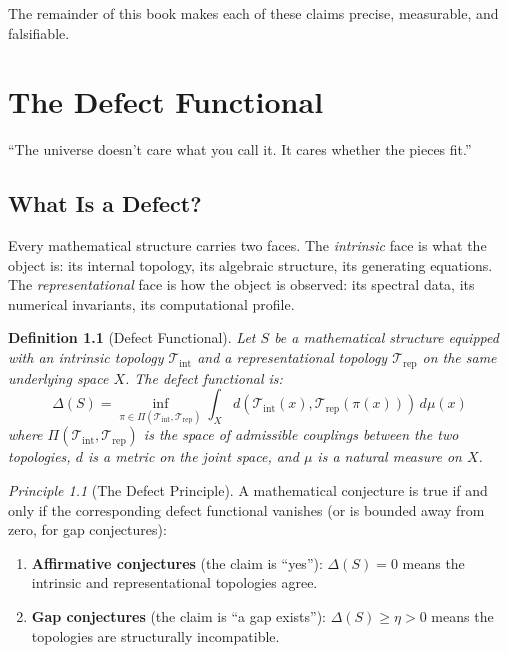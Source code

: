 \documentclass[12pt, openany]{book}
\newtheorem{definition}[theorem]{Definition}
\theoremstyle{remark}
\newtheorem{principle}[theorem]{Principle}
\newcommand{\Tint}{\mathcal{T}_{\mathrm{int}}}
\newcommand{\Trep}{\mathcal{T}_{\mathrm{rep}}}
\begin{document}
\noindent
The remainder of this book makes each of these claims precise, measurable, and
falsifiable.

\bigskip


\chapter{The Defect Functional}
\label{ch:defect}

\epigraph{``The universe doesn't care what you call it. It cares whether the pieces fit.''}{}

\section{What Is a Defect?}

Every mathematical structure carries two faces. The \emph{intrinsic} face is what the
object is: its internal topology, its algebraic structure, its generating equations.
The \emph{representational} face is how the object is observed: its spectral data,
its numerical invariants, its computational profile.

\begin{definition}[Defect Functional]
\label{def:defect}
Let $S$ be a mathematical structure equipped with an intrinsic topology $\Tint$ and a
representational topology $\Trep$ on the same underlying space $X$. The
\emph{defect functional} is:
\[
  \boxed{\Delta(S) = \inf_{\pi \in \Pi(\Tint, \Trep)} \int_X d(\Tint(x), \Trep(\pi(x)))\, d\mu(x)}
\]
where $\Pi(\Tint, \Trep)$ is the space of admissible couplings between the two topologies,
$d$ is a metric on the joint space, and $\mu$ is a natural measure on $X$.
\end{definition}

\begin{principle}[The Defect Principle]
\label{prin:defect}
A mathematical conjecture is true if and only if the corresponding defect functional
vanishes (or is bounded away from zero, for gap conjectures):
\begin{enumerate}
  \item \textbf{Affirmative conjectures} (the claim is ``yes''): $\Delta(S) = 0$ means
        the intrinsic and representational topologies agree.
  \item \textbf{Gap conjectures} (the claim is ``a gap exists''): $\Delta(S) \geq \eta > 0$
        means the topologies are structurally incompatible.
\end{enumerate}
\end{principle}
\end{document}
